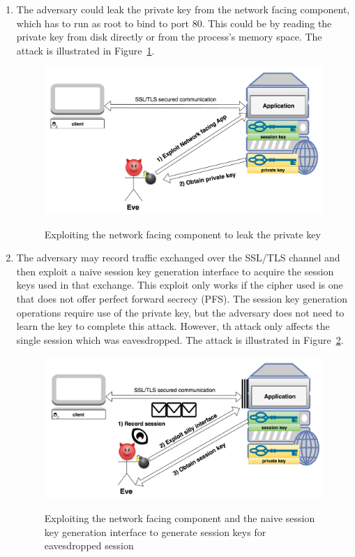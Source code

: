 \documentclass[../main.tex]{subfiles}
\begin{document}
\begin{enumerate}     
	\item The adversary could leak the private key from
	the network facing component, which has to run as root to bind to port 80.
	This could be by reading the private key from disk directly or from the
	process's memory space. The attack is illustrated in
	Figure~\ref{fig:attack1}.

	\begin{figure}[H]
		\centering
		\includegraphics[scale=0.15]{images/attack1.png}
		\label{fig:attack1}
		\caption{Exploiting the network facing component to leak the
		private key}
	\end{figure}

	\item The adversary may record traffic exchanged over the SSL/TLS channel
	and then exploit a naive session key generation interface to acquire the
	session keys used in that exchange. This exploit only works if the cipher
	used is one that does not offer perfect forward secrecy (PFS). The session
	key generation operations require use of the private key, but the adversary
	does not need to learn the key to complete this attack. However, th attack
	only affects the single session which was eavesdropped. The attack is
	illustrated in Figure~\ref{fig:attack2}.

	\begin{figure}[H]
		\centering
		\includegraphics[scale=0.15]{images/attack2.png}
		\label{fig:attack2}
		\caption{Exploiting the network facing component and the naive 
		session key generation interface to generate session keys for
		eavesdropped session}
	\end{figure}
\end{enumerate}
\end{document}
